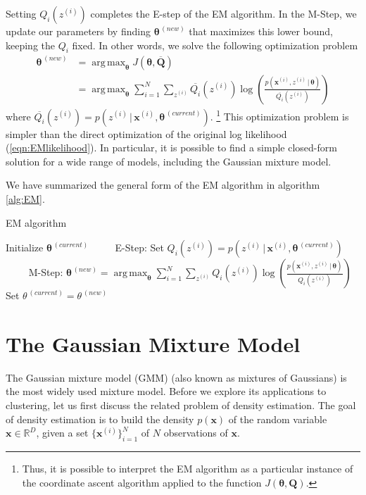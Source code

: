 \documentclass[final,3p,times,twocolumn]{elsarticle}
\DeclareMathOperator*{\argmax}{arg\,max}
\let\bs\boldsymbol
\let\ol\overline
\begin{document}
Setting $Q_i(z^{(i)})$ completes the E-step of the EM algorithm.
In the M-Step, we update our parameters by finding $\bs\theta^{\,(new)}$ that maximizes this lower bound, keeping the $Q_i$ fixed.
In other words, we solve the following optimization problem
\begin{equation}
\label{eqn:EM-M}
\begin{split}
\bs\theta^{\,(new)} &= \argmax_{\bs\theta} J(\bs\theta,\ol{\bs Q}) \\
&= \argmax_{\bs\theta}\sum_{i=1}^N \sum_{z^{(i)}} \ol{Q_i}(z^{(i)}) \log \left( \frac{p(\bs x^{(i)},z^{(i)}\,|\,\bs\theta)}{\ol{Q_i}(z^{(i)})}\right) 
\end{split}
\end{equation}
where $\ol{Q_i}(z^{(i)}) = p(z^{(i)}\,|\,\bs x^{(i)},\bs\theta^{\,(current)})$.
\footnote{Thus, it is possible to interpret the EM algorithm as a particular instance of the coordinate ascent algorithm applied to the function $J(\bs\theta,\bs Q)$.}
This optimization problem is simpler than the direct optimization of the original log likelihood (\ref{eqn:EMlikelihood}).
In particular, it is possible to find a simple closed-form solution for a wide range of models, including the Gaussian mixture model.

We have summarized the general form of the EM algorithm in algorithm \ref{alg:EM}.

\begin{algorithm}
\caption{EM algorithm}
\label{alg:EM}
\begin{algorithmic}[1]
\State Initialize $\bs\theta^{\,(current)}$
\Statex\Repeat
\Statex $\qquad$ E-Step:
\State Set $Q_i(z^{(i)}) = p(z^{(i)}\,|\,\bs x^{(i)},\bs\theta^{\,(current)})$
\EndFor
\Statex\Statex $\qquad$ M-Step:
\State $\bs\theta^{\,(new)} = \argmax_{\bs\theta}\sum_{i=1}^N \sum_{z^{(i)}} Q_i(z^{(i)}) \log \left( \frac{p(\bs x^{(i)},z^{(i)}\,|\,\bs\theta)}{Q_i(z^{(i)})}\right)$
\State Set $\theta^{\,(current)} = \theta^{\,(new)}$
\Statex\State\Return{  $\bs\theta^{\,(current)},z^{(1)}, \dots, z^{(N)}$}
\end{algorithmic}
\end{algorithm}




\section{The Gaussian Mixture Model}
\label{sect:gmm}
The Gaussian mixture model (GMM) (also known as mixtures of Gaussians) is the most widely used mixture model.
Before we explore its applications to clustering, let us first discuss the related problem of density estimation.
The goal of density estimation is to build the density $p(\boldsymbol x)$ of the random variable $\boldsymbol x \in \mathbb{R}^D$, given a set $\{\boldsymbol x^{(i)}\}_{i=1}^N$ of $N$ observations of $\boldsymbol x$.
\end{document}
